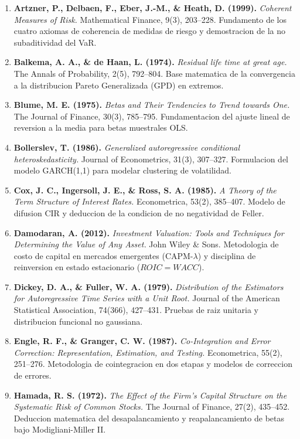 \documentclass[10pt,a4paper]{article}
\theoremstyle{definition}
\begin{document}
\begin{enumerate}
    \item \textbf{Artzner, P., Delbaen, F., Eber, J.-M., \& Heath, D. (1999).} \textit{Coherent Measures of Risk.} Mathematical Finance, 9(3), 203--228. Fundamento de los cuatro axiomas de coherencia de medidas de riesgo y demostracion de la no subaditividad del VaR.
    \item \textbf{Balkema, A. A., \& de Haan, L. (1974).} \textit{Residual life time at great age.} The Annals of Probability, 2(5), 792--804. Base matematica de la convergencia a la distribucion Pareto Generalizada (GPD) en extremos.
    \item \textbf{Blume, M. E. (1975).} \textit{Betas and Their Tendencies to Trend towards One.} The Journal of Finance, 30(3), 785--795. Fundamentacion del ajuste lineal de reversion a la media para betas muestrales OLS.
    \item \textbf{Bollerslev, T. (1986).} \textit{Generalized autoregressive conditional heteroskedasticity.} Journal of Econometrics, 31(3), 307--327. Formulacion del modelo GARCH(1,1) para modelar clustering de volatilidad.
    \item \textbf{Cox, J. C., Ingersoll, J. E., \& Ross, S. A. (1985).} \textit{A Theory of the Term Structure of Interest Rates.} Econometrica, 53(2), 385--407. Modelo de difusion CIR y deduccion de la condicion de no negatividad de Feller.
    \item \textbf{Damodaran, A. (2012).} \textit{Investment Valuation: Tools and Techniques for Determining the Value of Any Asset.} John Wiley \& Sons. Metodologia de costo de capital en mercados emergentes ($\text{CAPM-}\lambda$) y disciplina de reinversion en estado estacionario ($ROIC=WACC$).
    \item \textbf{Dickey, D. A., \& Fuller, W. A. (1979).} \textit{Distribution of the Estimators for Autoregressive Time Series with a Unit Root.} Journal of the American Statistical Association, 74(366), 427--431. Pruebas de raiz unitaria y distribucion funcional no gaussiana.
    \item \textbf{Engle, R. F., \& Granger, C. W. (1987).} \textit{Co-Integration and Error Correction: Representation, Estimation, and Testing.} Econometrica, 55(2), 251--276. Metodologia de cointegracion en dos etapas y modelos de correccion de errores.
    \item \textbf{Hamada, R. S. (1972).} \textit{The Effect of the Firm's Capital Structure on the Systematic Risk of Common Stocks.} The Journal of Finance, 27(2), 435--452. Deduccion matematica del desapalancamiento y reapalancamiento de betas bajo Modigliani-Miller II.

\end{enumerate}
\end{document}
